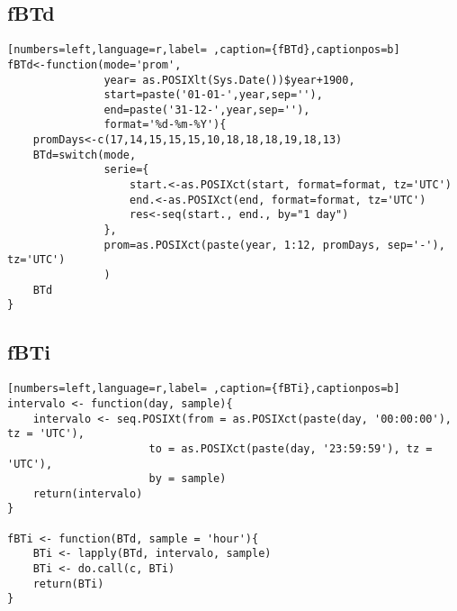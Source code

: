 \subsection{fBTd}
\label{sec:org6304576}
\label{subsec:fbtd}
\begin{lstlisting}[numbers=left,language=r,label= ,caption={fBTd},captionpos=b]
fBTd<-function(mode='prom',
               year= as.POSIXlt(Sys.Date())$year+1900,
               start=paste('01-01-',year,sep=''),
               end=paste('31-12-',year,sep=''), 
               format='%d-%m-%Y'){
    promDays<-c(17,14,15,15,15,10,18,18,18,19,18,13)
    BTd=switch(mode,
               serie={
                   start.<-as.POSIXct(start, format=format, tz='UTC')
                   end.<-as.POSIXct(end, format=format, tz='UTC')
                   res<-seq(start., end., by="1 day")
               },
               prom=as.POSIXct(paste(year, 1:12, promDays, sep='-'), tz='UTC')
               )
    BTd
}
\end{lstlisting}
\subsection{fBTi}
\label{sec:org0acbd9e}
\label{subsec:fbti}
\begin{lstlisting}[numbers=left,language=r,label= ,caption={fBTi},captionpos=b]
intervalo <- function(day, sample){
    intervalo <- seq.POSIXt(from = as.POSIXct(paste(day, '00:00:00'), tz = 'UTC'),
                      to = as.POSIXct(paste(day, '23:59:59'), tz = 'UTC'),
                      by = sample)
    return(intervalo)
}

fBTi <- function(BTd, sample = 'hour'){
    BTi <- lapply(BTd, intervalo, sample)
    BTi <- do.call(c, BTi)
    return(BTi)
}
\end{lstlisting}
